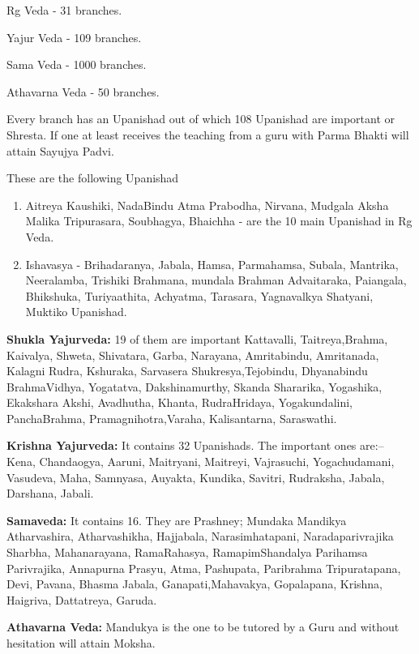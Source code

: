 Rg Veda - 31 branches.

Yajur Veda - 109 branches.

Sama Veda - 1000 branches.

Athavarna Veda - 50 branches.

Every branch has an Upanishad out of which 108 Upanishad are important or Shresta. If one at least receives the teaching from a guru with Parma Bhakti will attain Sayujya Padvi.

\newpage

These are the following Upanishad

\begin{enumerate}
\item Aitreya Kaushiki, NadaBindu Atma Prabodha, Nirvana, Mudgala Aksha Malika Tripurasara, Soubhagya, Bhaichha - are the 10 main Upanishad in Rg Veda.

 \item Ishavasya - Brihadaranya, Jabala, Hamsa, Parmahamsa, Subala, Mantrika, Neeralamba, Trishiki Brahmana, mundala Brahman Advaitaraka, Paiangala, Bhikshuka, Turiyaathita, Achyatma, Tarasara, Yagnavalkya Shatyani, Muktiko Upanishad.

\end{enumerate}

\textbf{Shukla Yajurveda:} 19 of them are important Kattavalli, Taitreya,\break Brahma, Kaivalya, Shweta, Shivatara, Garba, Narayana, Amrita\break bindu, Amritanada, Kalagni Rudra, Kshuraka, Sarvasera Shukresya,\break Tejobindu, Dhyanabindu BrahmaVidhya, Yogatatva, Dakshinamurthy, Skanda Shararika, Yogashika, Ekakshara Akshi, Avadhutha, Khanta, RudraHridaya, Yogakundalini, PanchaBrahma, Pramagnihotra,\break Varaha, Kalisantarna, Saraswathi.

\textbf{Krishna Yajurveda:} It contains 32 Upanishads. The important ones are:– Kena, Chandaogya, Aaruni, Maitryani, Maitreyi, Vajrasuchi, Yogachudamani, Vasudeva, Maha, Samnyasa, Auyakta, Kundika, Savitri, Rudraksha, Jabala, Darshana, Jabali.

\textbf{Samaveda:} It contains 16. They are Prashney; Mundaka Mandikya Atharvashira, Atharvashikha, Hajjabala, Narasimhatapani, Narada\break parivrajika Sharbha, Mahanarayana, RamaRahasya, Ramapim\break Shandalya Parihamsa Parivrajika, Annapurna Prasyu, Atma, Pashupata, Paribrahma Tripuratapana, Devi, Pavana, Bhasma Jabala, Ganapati,\break Mahavakya, Gopalapana, Krishna, Haigriva, Dattatreya, Garuda.

\textbf{Athavarna Veda:} Mandukya is the one to be tutored by a Guru and without hesitation will attain Moksha.

